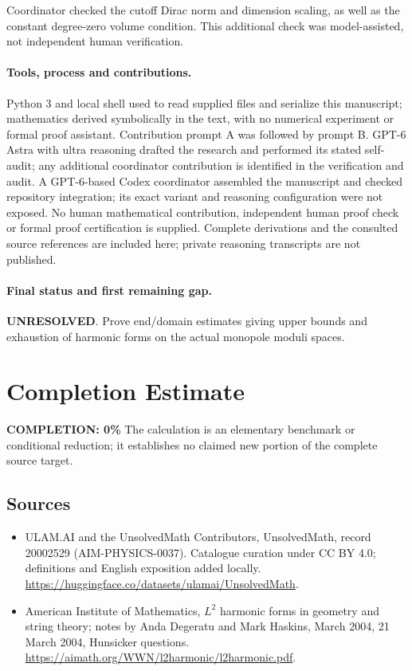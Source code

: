 \documentclass[11pt]{article}
\begin{document}
Coordinator checked the cutoff Dirac norm and dimension scaling, as well as the constant degree-zero volume condition. This additional check was model-assisted, not independent human verification.

\paragraph{Tools, process and contributions.}
Python 3 and local shell used to read supplied files and serialize this manuscript; mathematics derived symbolically in the text, with no numerical experiment or formal proof assistant. Contribution prompt A was followed by prompt B. GPT-6 Astra with ultra reasoning drafted the research and performed its stated self-audit; any additional coordinator contribution is identified in the verification and audit. A GPT-6-based Codex coordinator assembled the manuscript and checked repository integration; its exact variant and reasoning configuration were not exposed. No human mathematical contribution, independent human proof check or formal proof certification is supplied. Complete derivations and the consulted source references are included here; private reasoning transcripts are not published.

\paragraph{Final status and first remaining gap.}
\textbf{UNRESOLVED}. Prove end/domain estimates giving upper bounds and exhaustion of harmonic forms on the actual monopole moduli spaces.

\section{Completion Estimate}
\noindent\textbf{COMPLETION: 0\%}
The calculation is an elementary benchmark or conditional reduction; it establishes no claimed new portion of the complete source target.

\subsection{Sources}
\begin{itemize}
\item[\hypertarget{source:20002529:1}{S1}] ULAM.AI and the UnsolvedMath Contributors, UnsolvedMath, record 20002529 (AIM-PHYSICS-0037). Catalogue curation under CC BY 4.0; definitions and English exposition added locally.
\url{https://huggingface.co/datasets/ulamai/UnsolvedMath}.
\item[\hypertarget{source:20002529:2}{S2}] American Institute of Mathematics, $L^2$ harmonic forms in geometry and string theory; notes by Anda Degeratu and Mark Haskins, March 2004, 21 March 2004, Hunsicker questions.
\url{https://aimath.org/WWN/l2harmonic/l2harmonic.pdf}.
\end{itemize}
\label{end:20002529}
\end{document}
